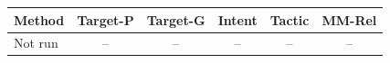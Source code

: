 \begin{tabular*}{0.95\textwidth}{@{\extracolsep{\fill}}lccccc@{}}
\toprule
Method & Target-P & Target-G & Intent & Tactic & MM-Rel\\
\midrule
Not run & -- & -- & -- & -- & -- \\
\bottomrule
\end{tabular*}
